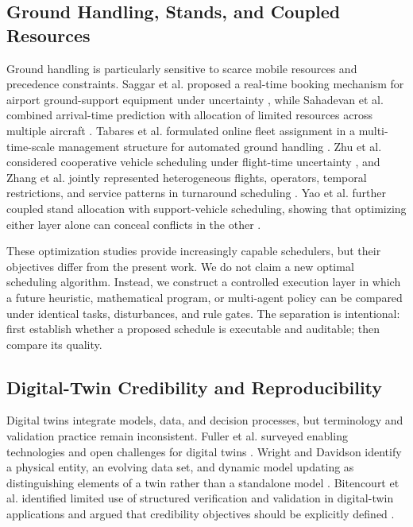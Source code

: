 \documentclass[runningheads]{llncs}
\begin{document}
\subsection{Ground Handling, Stands, and Coupled Resources}
Ground handling is particularly sensitive to scarce mobile resources and precedence constraints. Saggar et al. proposed a real-time booking mechanism for airport ground-support equipment under uncertainty \cite{saggar2021}, while Sahadevan et al. combined arrival-time prediction with allocation of limited resources across multiple aircraft \cite{sahadevan2023}. Tabares et al. formulated online fleet assignment in a multi-time-scale management structure for automated ground handling \cite{tabares2021}. Zhu et al. considered cooperative vehicle scheduling under flight-time uncertainty \cite{zhu2022}, and Zhang et al. jointly represented heterogeneous flights, operators, temporal restrictions, and service patterns in turnaround scheduling \cite{zhang2024}. Yao et al. further coupled stand allocation with support-vehicle scheduling, showing that optimizing either layer alone can conceal conflicts in the other \cite{yao2024}.

These optimization studies provide increasingly capable schedulers, but their objectives differ from the present work. We do not claim a new optimal scheduling algorithm. Instead, we construct a controlled execution layer in which a future heuristic, mathematical program, or multi-agent policy can be compared under identical tasks, disturbances, and rule gates. The separation is intentional: first establish whether a proposed schedule is executable and auditable; then compare its quality.

\subsection{Digital-Twin Credibility and Reproducibility}
Digital twins integrate models, data, and decision processes, but terminology and validation practice remain inconsistent. Fuller et al. surveyed enabling technologies and open challenges for digital twins \cite{fuller2020}. Wright and Davidson identify a physical entity, an evolving data set, and dynamic model updating as distinguishing elements of a twin rather than a standalone model \cite{wright2020}. Bitencourt et al. identified limited use of structured verification and validation in digital-twin applications and argued that credibility objectives should be explicitly defined \cite{bitencourt2025}.
\end{document}
